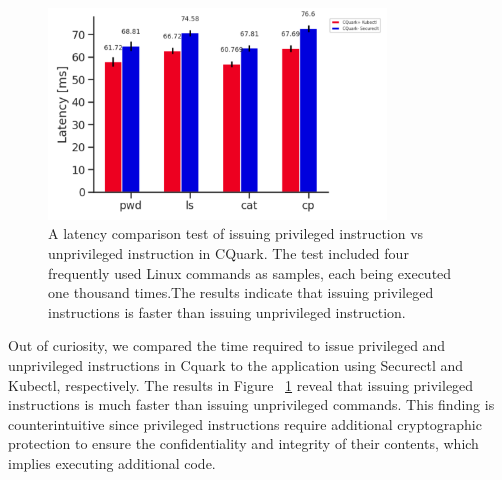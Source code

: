 \begin{figure}[H]
    \centering
    \includegraphics[width=0.8\textwidth]{images/speed_of_issuing_cmd_in_cquark_kubctl_securectl.PNG}
    \caption[Benchmark result - Latency Comparison of issuing privileged instruction vs unprivileged instruction in CQuark]{A latency comparison test of issuing privileged instruction vs unprivileged instruction in CQuark.  The test included four frequently used Linux commands as samples, 
    each being executed one thousand times.The results indicate that issuing privileged instructions is faster than issuing unprivileged instruction.
    }
    \label{fig:speed_of_issuing_cmd_in_cquark_kubctl_securectl}
\end{figure}


Out of curiosity, we compared the time required to issue privileged and unprivileged instructions in Cquark to the application using Securectl and Kubectl, respectively. The results in Figure ~\ref{fig:speed_of_issuing_cmd_in_cquark_kubctl_securectl} reveal that issuing privileged instructions is much faster than issuing unprivileged commands. This finding is counterintuitive since 
privileged instructions require additional cryptographic protection to ensure the confidentiality and integrity of their contents, which implies executing additional code.

